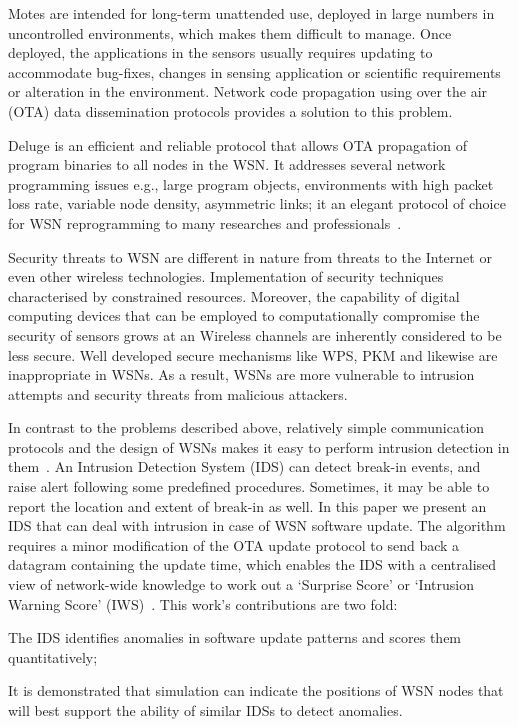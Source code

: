 \documentclass[conference]{IEEEtran}
\begin{document}
Motes are intended for long-term unattended use, deployed in large numbers in uncontrolled environments, which makes them difficult to manage.
Once deployed, the applications in the sensors usually requires updating to accommodate bug-fixes, changes in sensing application or scientific requirements or alteration in the environment.
Network code propagation using over the air (OTA) data dissemination protocols provides a solution to this problem.

Deluge is an efficient and reliable protocol that allows OTA propagation of program binaries to all nodes in the WSN.
It addresses several network programming issues e.g., large program objects, environments with high packet loss rate, variable node density, asymmetric links; it an elegant protocol of choice for  WSN reprogramming to many researches and professionals~\cite{1031506}.

Security threats to WSN are different in nature from threats to the Internet or even other wireless technologies. %
Implementation of security techniques characterised by constrained resources.
Moreover, the capability of digital computing devices that can be employed to computationally compromise the security of sensors grows at an Wireless channels are inherently considered to be less secure.
Well developed secure mechanisms like WPS, PKM and likewise are inappropriate in WSNs. %
As a result, WSNs are more vulnerable to intrusion attempts and security threats from malicious attackers.


In contrast to the problems described above, relatively simple communication protocols and the design of WSNs makes it easy to perform intrusion detection in them~\cite{quing09}.
An Intrusion Detection System (IDS) can detect  break-in events, and raise alert following some predefined procedures.
Sometimes, it may be able to report the location and extent of break-in as well.
In this paper we present an IDS that can deal with intrusion in case of WSN software update.
The algorithm requires a minor modification of the OTA update protocol to send back a datagram containing the update time, 
which enables the IDS with a centralised view of network-wide knowledge to work out a  `Surprise Score' or `Intrusion Warning Score' (IWS)~\cite{tep116}.
This work's contributions are two fold: 
\begin{inparaenum}
\item  The IDS identifies anomalies in software update patterns and scores them quantitatively;
\item It is demonstrated that simulation can indicate the positions of WSN nodes that will best support the ability of similar IDSs to detect anomalies.
\end{inparaenum}
\end{document}
